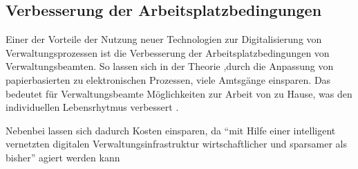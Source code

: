 \subsection{Verbesserung der Arbeitsplatzbedingungen}
Einer der Vorteile der Nutzung neuer Technologien zur Digitalisierung von Verwaltungsprozessen ist die Verbesserung der Arbeitsplatzbedingungen von Verwaltungsbeamten.
So lassen sich in der Theorie ,durch die Anpassung von papierbasierten zu elektronischen Prozessen, viele Amtsgänge einsparen.
Das bedeutet für Verwaltungsbeamte Möglichkeiten zur Arbeit von zu Hause, was den individuellen Lebensrhytmus verbessert \citep[S.181][]{von_Lucke_2016}.
\par
Nebenbei lassen sich dadurch Kosten einsparen, da ``mit Hilfe einer intelligent vernetzten digitalen Verwaltungsinfrastruktur wirtschaftlicher und sparsamer als bisher'' agiert werden kann \citep[][S.182]{von_Lucke_2016}